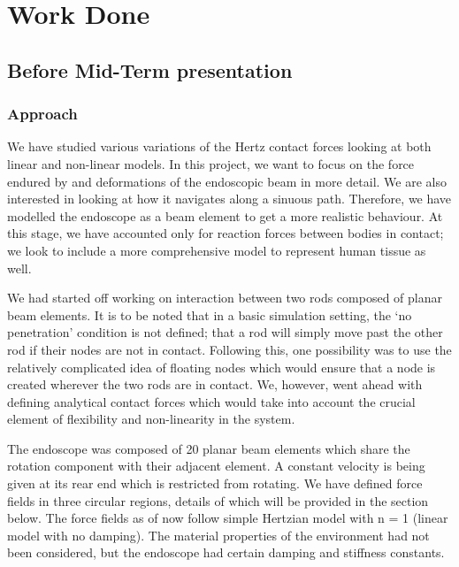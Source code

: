 \documentclass[12pt]{report}
\begin{document}
\vspace{\baselineskip}

\vspace{\baselineskip}



\newpage

\vspace{\baselineskip}
\vspace{\baselineskip}
\section*{Work Done}
\subsection*{Before Mid-Term presentation}
\subsubsection*{Approach}
We have studied various variations of the Hertz contact forces looking at both linear and non-linear models. In this project, we want to focus on the force endured by and deformations of the endoscopic beam in more detail. We are also interested in looking at how it navigates along a sinuous path. Therefore, we have modelled the endoscope as a beam element to get a more realistic behaviour. At this stage, we have accounted only for reaction forces between bodies in contact; we look to include a more comprehensive model to represent human tissue as well. \par

We had started off working on interaction between two rods composed of planar beam elements. It is to be noted that in a basic simulation setting, the ‘no penetration’ condition is not defined; that a rod will simply move past the other rod if their nodes are not in contact. Following this, one possibility was to use the relatively complicated idea of floating nodes which would ensure that a node is created wherever the two rods are in contact. We, however, went ahead with defining analytical contact forces which would take into account the crucial element of flexibility and non-linearity in the system.\par

The endoscope was composed of 20 planar beam elements which share the rotation component with their adjacent element. A constant velocity is being given at its rear end which is restricted from rotating. We have defined force fields in three circular regions, details of which will be provided in the section below. The force fields as of now follow simple Hertzian model with n = 1 (linear model with no damping). The material properties of the environment had not been considered, but the endoscope had certain damping and stiffness constants.\par
\end{document}
